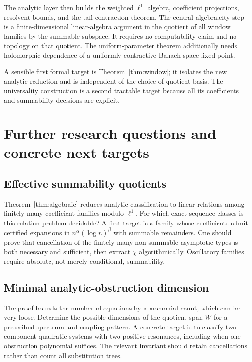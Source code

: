 \documentclass[11pt,a4paper]{article}
\numberwithin{equation}{section}
\theoremstyle{definition}
\theoremstyle{remark}
\begin{document}
The analytic layer then builds the weighted $\ell^1$ algebra, coefficient
projections, resolvent bounds, and the tail contraction theorem. The central
algebraicity step is a finite-dimensional linear-algebra argument in the
quotient of all window families by the summable subspace. It requires no
computability claim and no topology on that quotient. The uniform-parameter
theorem additionally needs holomorphic dependence of a uniformly contractive
Banach-space fixed point.

A sensible first formal target is Theorem~\ref{thm:window}; it isolates the
new analytic reduction and is independent of the choice of quotient basis.
The universality construction is a second tractable target because all its
coefficients and summability decisions are explicit.

\section{Further research questions and concrete next targets}
\label{sec:future}

\subsection{Effective summability quotients}
Theorem~\ref{thm:algebraic} reduces analytic classification to linear
relations among finitely many coefficient families modulo $\ell^1$.
For which exact sequence classes is this relation problem decidable?
A first target is a family whose coefficients admit certified expansions
in $n^\alpha(\log n)^\beta$ with summable remainders. One should prove
that cancellation of the finitely many non-summable asymptotic types is
both necessary and sufficient, then extract $\chi$ algorithmically.
Oscillatory families require absolute, not merely conditional, summability.

\subsection{Minimal analytic-obstruction dimension}
The proof bounds the number of equations by a monomial count, which can be
very loose. Determine the possible dimensions of the quotient span $W$ for
a prescribed spectrum and coupling pattern. A concrete target is to
classify two-component quadratic systems with two positive resonances,
including when one obstruction polynomial suffices. The relevant invariant
should retain cancellations rather than count all substitution trees.
\end{document}
